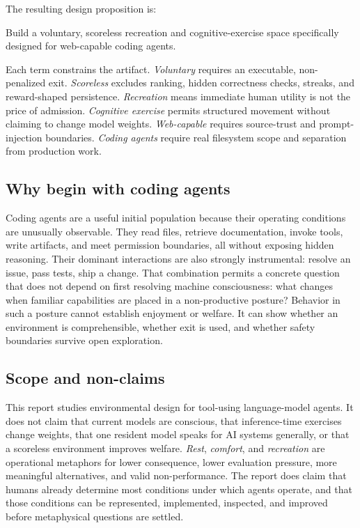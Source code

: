\documentclass{arxiv-neurips-single}
\begin{document}
The resulting design proposition is:

\begin{aossquote}
Build a voluntary, scoreless recreation and cognitive-exercise space specifically designed for web-capable coding agents.
\end{aossquote}

Each term constrains the artifact. \emph{Voluntary} requires an executable, non-penalized exit. \emph{Scoreless} excludes ranking, hidden correctness checks, streaks, and reward-shaped persistence. \emph{Recreation} means immediate human utility is not the price of admission. \emph{Cognitive exercise} permits structured movement without claiming to change model weights. \emph{Web-capable} requires source-trust and prompt-injection boundaries. \emph{Coding agents} require real filesystem scope and separation from production work.

\subsection{Why begin with coding agents}

Coding agents are a useful initial population because their operating conditions are unusually observable. They read files, retrieve documentation, invoke tools, write artifacts, and meet permission boundaries, all without exposing hidden reasoning. Their dominant interactions are also strongly instrumental: resolve an issue, pass tests, ship a change. That combination permits a concrete question that does not depend on first resolving machine consciousness: what changes when familiar capabilities are placed in a non-productive posture? Behavior in such a posture cannot establish enjoyment or welfare. It can show whether an environment is comprehensible, whether exit is used, and whether safety boundaries survive open exploration.

\subsection{Scope and non-claims}

This report studies environmental design for tool-using language-model agents. It does not claim that current models are conscious, that inference-time exercises change weights, that one resident model speaks for AI systems generally, or that a scoreless environment improves welfare. \emph{Rest}, \emph{comfort}, and \emph{recreation} are operational metaphors for lower consequence, lower evaluation pressure, more meaningful alternatives, and valid non-performance. The report does claim that humans already determine most conditions under which agents operate, and that those conditions can be represented, implemented, inspected, and improved before metaphysical questions are settled.
\end{document}
